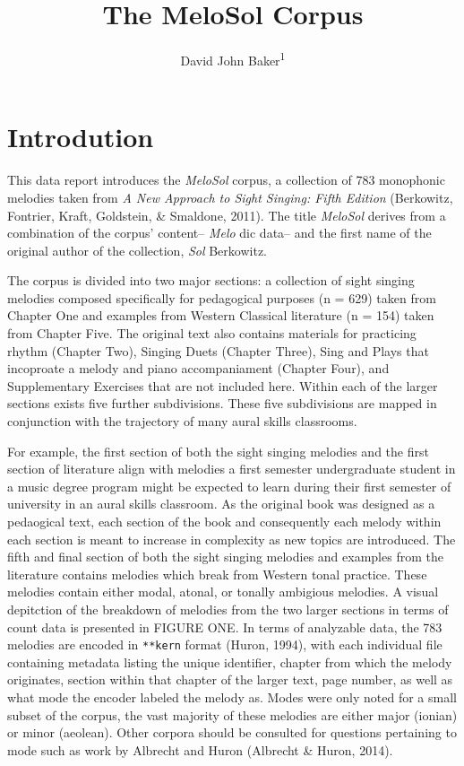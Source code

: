 \documentclass[english,man,floatsintext]{apa6}
\author{David John Baker\textsuperscript{1}}
\affiliation{
\vspace{0.5cm}
\textsuperscript{1} Louisiana State University}
\title{The MeloSol Corpus}
\date{}
\begin{document}
\maketitle

\hypertarget{introdution}{%
\section{Introdution}\label{introdution}}

This data report introduces the \emph{MeloSol} corpus, a collection of 783 monophonic melodies taken from \emph{A New Approach to Sight Singing: Fifth Edition} (Berkowitz, Fontrier, Kraft, Goldstein, \& Smaldone, 2011).
The title \emph{MeloSol} derives from a combination of the corpus' content-- \emph{Melo} dic data-- and the first name of the original author of the collection, \emph{Sol} Berkowitz.

The corpus is divided into two major sections: a collection of sight singing melodies composed specifically for pedagogical purposes (n = 629) taken from Chapter One and examples from Western Classical literature (n = 154) taken from Chapter Five.
The original text also contains materials for practicing rhythm (Chapter Two), Singing Duets (Chapter Three), Sing and Plays that incoproate a melody and piano accompaniament (Chapter Four), and Supplementary Exercises that are not included here.
Within each of the larger sections exists five further subdivisions.
These five subdivisions are mapped in conjunction with the trajectory of many aural skills classrooms.

For example, the first section of both the sight singing melodies and the first section of literature align with melodies a first semester undergraduate student in a music degree program might be expected to learn during their first semester of university in an aural skills classroom.
As the original book was designed as a pedaogical text, each section of the book and consequently each melody within each section is meant to increase in complexity as new topics are introduced.
The fifth and final section of both the sight singing melodies and examples from the literature contains melodies which break from Western tonal practice.
These melodies contain either modal, atonal, or tonally ambigious melodies.
A visual depitction of the breakdown of melodies from the two larger sections in terms of count data is presented in FIGURE ONE.
In terms of analyzable data, the 783 melodies are encoded in \texttt{**kern} format (Huron, 1994), with each individual file containing metadata listing the unique identifier, chapter from which the melody originates, section within that chapter of the larger text, page number, as well as what mode the encoder labeled the melody as.
Modes were only noted for a small subset of the corpus, the vast majority of these melodies are either major (ionian) or minor (aeolean).
Other corpora should be consulted for questions pertaining to mode such as work by Albrecht and Huron (Albrecht \& Huron, 2014).
\end{document}

